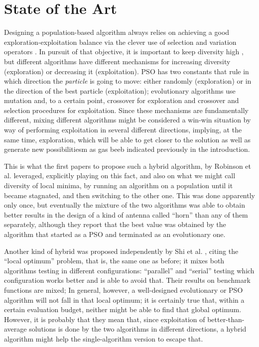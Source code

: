 \documentclass[runningheads]{llncs}
\begin{document}
\section{State of the Art}
\label{soa}

Designing a population-based algorithm always relies on achieving a
good exploration-exploitation balance via the clever use of selection
and variation operators \cite{vcrepinvsek2013exploration}. In pursuit
of that objective, it is important to keep diversity high
\cite{yuan2005importance}, but different algorithms have different
mechanisms for increasing diversity (exploration) or decreasing it
(exploitation). PSO has two constants that rule in which direction the
{\em particle} is going to move: either randomly (exploration) or in
the direction of the best particle (exploitation); evolutionary
algorithms use mutation and, to a certain point, crossover for
exploration and crossover and selection procedures for
exploitation. Since these mechanisms are fundamentally different,
mixing different algorithms might be considered a win-win situation by
way of performing exploitation in several different directions,
implying, at the same time, exploration, which will be able to get
closer to the solution as well as generate new possibilitiesm as gas
beeb indicated previously in the introduction.

This is what the first papers to propose such a hybrid algorithm, by
Robinson et al. \cite{Robinson2002} leveraged, explicitly playing on this
fact, and also on what we might call diversity of local minima, by
running an algorithm on a population until it became stagnated, and
then switching to the other one. This was done apparently only once,
but eventually the mixture of the two algorithms was able to obtain
better results in the design of a kind of antenna called ``horn'' than
any of them separately, although they report that the best value
was obtained by the algorithm that started as a PSO and terminated as
an evolutionary one.

Another kind of hybrid was proposed independently by
Shi et al. \cite{shi2003hybrid}, citing the ``local optimum'' problem,
that is, the same one as before; it mixes both algorithms
testing in different configurations: ``parallel'' and ``serial''
testing which configuration works better and is able to avoid
that. Their results on benchmark functions are mixed;
In general, however, a well-designed evolutionary or PSO
algorithm will not fall in that local optimum; it is certainly true
that, within a certain evaluation budget, neither might be able to
find that global optimum. However, it is probably that they mean that,
since exploitation of better-than-average solutions is done by the two
algorithms in different directions, a hybrid algorithm might help the
single-algorithm version to escape that.
\end{document}
